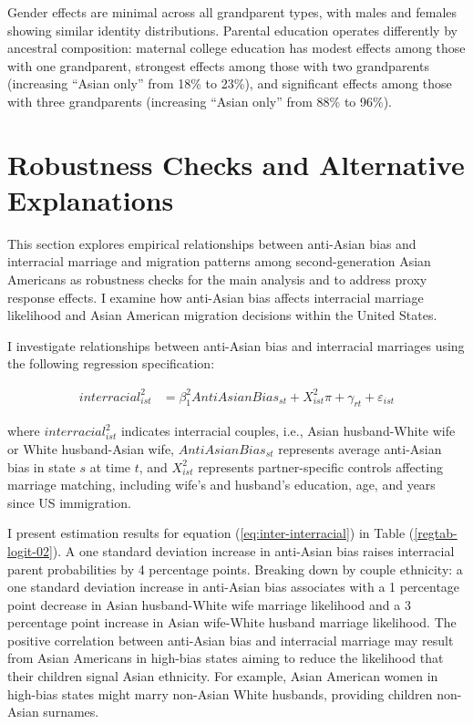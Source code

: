 Gender effects are minimal across all grandparent types, with males and females showing similar identity distributions. Parental education operates differently by ancestral composition: maternal college education has modest effects among those with one grandparent, strongest effects among those with two grandparents (increasing ``Asian only'' from 18\% to 23\%), and significant effects among those with three grandparents (increasing ``Asian only'' from 88\% to 96\%).

\section{Robustness Checks and Alternative Explanations}\label{sec:robcheck}

This section explores empirical relationships between anti-Asian bias and interracial marriage and migration patterns among second-generation Asian Americans as robustness checks for the main analysis and to address proxy response effects. I examine how anti-Asian bias affects interracial marriage likelihood and Asian American migration decisions within the United States.

I investigate relationships between anti-Asian bias and interracial marriages using the following regression specification:

\begin{align}
interracial_{ist}^2 &= \beta_1^2 AntiAsianBias_{st} + X_{ist}^2\pi + \gamma_{rt} 
            + \varepsilon_{ist}  \label{eq:inter-interracial} 
\end{align}

where $interracial_{ist}^2$ indicates interracial couples, i.e., Asian husband-White wife or White husband-Asian wife, $AntiAsianBias_{st}$ represents average anti-Asian bias in state $s$ at time $t$, and $X_{ist}^2$ represents partner-specific controls affecting marriage matching, including wife's and husband's education, age, and years since US immigration.

I present estimation results for equation (\ref{eq:inter-interracial}) in Table (\ref{regtab-logit-02}). A one standard deviation increase in anti-Asian bias raises interracial parent probabilities by 4 percentage points. Breaking down by couple ethnicity: a one standard deviation increase in anti-Asian bias associates with a 1 percentage point decrease in Asian husband-White wife marriage likelihood and a 3 percentage point increase in Asian wife-White husband marriage likelihood. The positive correlation between anti-Asian bias and interracial marriage may result from Asian Americans in high-bias states aiming to reduce the likelihood that their children signal Asian ethnicity. For example, Asian American women in high-bias states might marry non-Asian White husbands, providing children non-Asian surnames.

